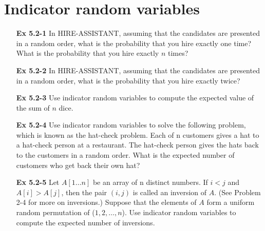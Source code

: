 \documentclass[fontsize=12pt,paper=a4]{book}
\begin{document}
\section{Indicator random variables}
\begin{enumerate}
 \item[\textbf{Ex 5.2-1}]
       In HIRE-ASSISTANT, assuming that the candidates are presented in a random order, what is the probability that you hire exactly one time? What is the probability that you hire exactly $n$ times?
       
 \item[\textbf{Ex 5.2-2}]
       In HIRE-ASSISTANT, assuming that the candidates are presented in a random order, what is the probability that you hire exactly twice?
       
 \item[\textbf{Ex 5.2-3}]
       Use indicator random variables to compute the expected value of the sum of $n$ dice.
       
 \item[\textbf{Ex 5.2-4}]
       Use indicator random variables to solve the following problem, which is known as the hat-check problem. Each of n customers gives a hat to a hat-check person at a restaurant. The hat-check person gives the hats back to the customers in a random order. What is the expected number of customers who get back their own hat?
       
 \item[\textbf{Ex 5.2-5}]
       Let $A[1 \dots n]$ be an array of n distinct numbers. If $i < j$ and $A[i] > A[j]$, then the pair $(i, j)$ is called an inversion of $A$. (See Problem 2-4 for more on inversions.) Suppose that the elements of $A$ form a uniform random permutation of ($1, 2, \dots , n$). Use indicator random variables to compute the expected number of inversions.
       
\end{enumerate}
\end{document}
